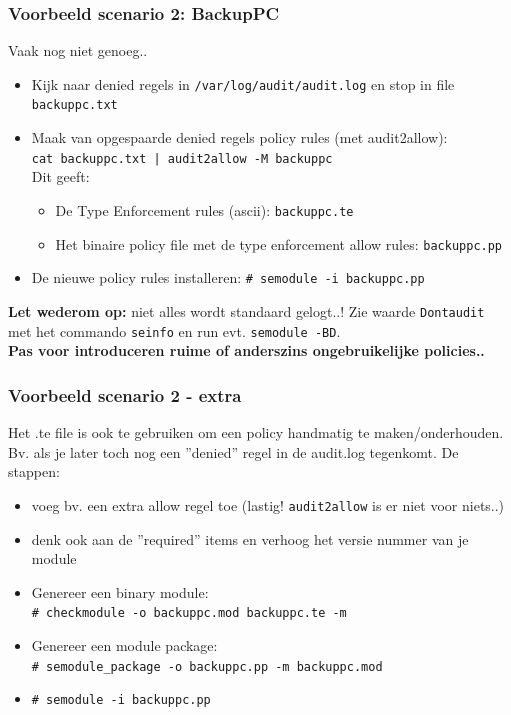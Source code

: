 \begin{styleframe}
    \frametitle{Voorbeeld scenario 2: BackupPC}
Vaak nog niet genoeg..
\begin{itemize}
	\item Kijk naar denied regels in {\tt /var/log/audit/audit.log} en stop in file {\tt backuppc.txt}
	\pause
	\item Maak van opgespaarde denied regels policy rules (met audit2allow): \\
	\footnotesize
	{\tt cat backuppc.txt  | audit2allow -M backuppc} \\
	\pause
	Dit geeft:
	\begin{itemize}
		\item De Type Enforcement rules (ascii): {\tt backuppc.te}
		\pause
		\item Het binaire policy file met de type enforcement allow rules: {\tt backuppc.pp}
	\end{itemize}
	\pause
	\item De nieuwe policy rules installeren: {\tt \# semodule -i backuppc.pp}
\end{itemize}
\pause
{\bf Let wederom op:} niet alles wordt standaard gelogt..! Zie waarde {\tt Dontaudit} met het commando {\tt seinfo} en run evt. {\tt semodule -BD}. \\
{\bf Pas voor introduceren ruime of anderszins ongebruikelijke policies..}
\end{styleframe}

\begin{styleframe}
    \frametitle{Voorbeeld scenario 2 - extra}
Het .te file is ook te gebruiken om een policy handmatig te maken/onderhouden. Bv. als je later toch nog een
''denied'' regel in de audit.log tegenkomt. De stappen:
\pause
\begin{itemize} 
	\item voeg bv. een extra allow regel toe (lastig! {\tt audit2allow} is er niet voor niets..)
	\pause
	\item denk ook aan de ''required'' items en verhoog het versie nummer van je module
	\pause
	\item Genereer een binary module: \\ 
	{\scriptsize {\tt \# checkmodule -o backuppc.mod backuppc.te -m}} \\
	\pause
	\item Genereer een module package: \\
	{\scriptsize {\tt \# semodule\_package -o backuppc.pp -m backuppc.mod}}
	\pause
	\item {\tt \# semodule -i backuppc.pp}
\end{itemize}
\end{styleframe}


